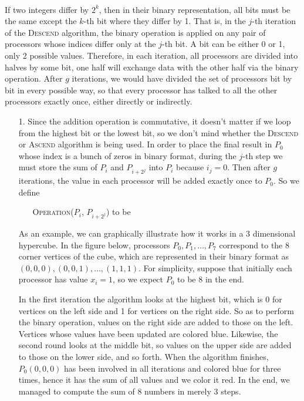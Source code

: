 \documentclass[11pt]{article}
\begin{document}
    \solution\\
    If two integers differ by $2^k$, then in their binary representation, all bits must be the same except the $k$-th bit where they differ by 1. That is, in the $j$-th iteration of the \textsc{Descend} algorithm, the binary operation is applied on any pair of processors whose indices differ only at the $j$-th bit. A bit can be either 0 or 1, only 2 possible values. Therefore, in each iteration, all processors are divided into halves by some bit, one half will exchange data with the other half via the binary operation. After $g$ iterations, we would have divided the set of processors bit by bit in every possible way, so that every processor has talked to all the other processors exactly once, either directly or indirectly.

    \begin{enumerate}[leftmargin=*]
      \item[1.] Since the addition operation is commutative, it doesn't matter if we loop from the highest bit or the lowest bit, so we don't mind whether the \textsc{Descend} or \textsc{Ascend} algorithm is being used. In order to place the final result in $P_0$ whose index is a bunch of zeros in binary format, during the $j$-th step we must store the sum of $P_i$ and $P_{i+2^j}$ into $P_i$ because $i_j=0$. Then after $g$ iterations, the value in each processor will be added exactly once to $P_0$. So we define
      \begin{enumerate}
          \item[] \textsc{Operation}($P_i$, $P_{i+2^j}$) to be 
      \end{enumerate}
      As an example, we can graphically illustrate how it works in a 3 dimensional hypercube. In the figure below, processors $P_0,P_1,\dots,P_7$ correspond to the 8 corner vertices of the cube, which are represented in their binary format as $(0,0,0),(0,0,1),\dots,(1,1,1)$. For simplicity, suppose that initially each processor has value $x_i=1$, so we expect $P_0$ to be 8 in the end.

      In the first iteration the algorithm looks at the highest bit, which is 0 for vertices on the left side and 1 for vertices on the right side. So as to perform the binary operation, values on the right side are added to those on the left. Vertices whose values have been updated are colored blue. Likewise, the second round looks at the middle bit, so values on the upper side are added to those on the lower side, and so forth. When the algorithm finishes, $P_0(0,0,0)$ has been involved in all iterations and colored blue for three times, hence it has the sum of all values and we color it red. In the end, we managed to compute the sum of 8 numbers in merely 3 steps.
    \end{enumerate}
\end{document}
